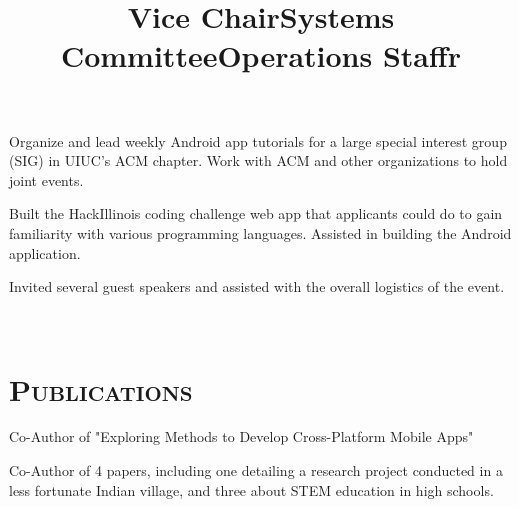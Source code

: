 \begin{resume}
\title{Vice Chair}
\begin{position}
Organize and lead weekly Android app tutorials for a large special interest group (SIG) in UIUC's ACM chapter. Work with ACM and other organizations to hold joint events.
\end{position}

\title{Systems Committee}
\begin{position}
Built the HackIllinois coding challenge web app that applicants could do to gain familiarity with various programming languages. Assisted in building the Android application.
\end{position}

\title{Operations Staff}
\begin{position}
Invited several guest speakers and assisted with the overall logistics of the event.
\end{position}

\begin{formatb}
  \title{r}\\
\end{formatb}

\section{\textsc{Publications}}

\title{}
\begin{position}
Co-Author of "Exploring Methods to Develop Cross-Platform Mobile Apps"
\end{position}

\title{}
\begin{position}
Co-Author of 4 papers, including one detailing a research project conducted in a less fortunate Indian village, and three about STEM education in high schools.
\end{position}

\end{resume}


